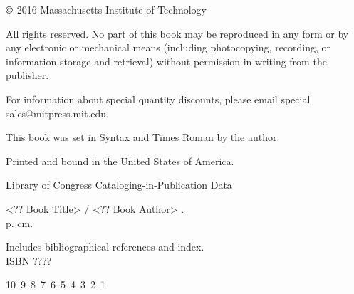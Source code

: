 \documentclass{Linguistics}
\begin{document}
\begin{copyrightpage}
	$\copyright$ 2016 Massachusetts Institute of Technology

	All rights reserved. No part of this book may be reproduced in
        any form or by any electronic or mechanical means (including
        photocopying, recording, or information storage and retrieval) without
        permission in writing from the publisher.

	For information about special quantity discounts, please email special sales@mitpress.mit.edu.

	This book was set in Syntax and Times Roman by the author.

	Printed and bound in the United States of America.

	Library of Congress Cataloging-in-Publication Data

	<?? Book Title> / <?? Book Author> .\\
	\hspace*{6pt} p. cm.

	Includes bibliographical references and index.\\
	ISBN ????
\vfill

10\ 9\ 8\ 7\ 6\ 5\ 4\ 3\ 2\ 1\

\end{copyrightpage}

\dedication{}







\end{document}

